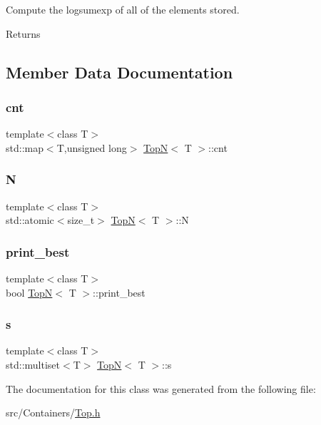 Compute the logsumexp of all of the elements stored. \begin{DoxyReturn}{Returns}

\end{DoxyReturn}


\subsection{Member Data Documentation}
\mbox{\label{class_top_n_a0b10798cc83ac3b20bfe0dd5f1d45e86}} 
\subsubsection{\texorpdfstring{cnt}{cnt}}
{\footnotesize\ttfamily template$<$class T$>$ \\
std\+::map$<$T,unsigned long$>$ \hyperlink{class_top_n}{TopN}$<$ T $>$\+::cnt}

\mbox{\label{class_top_n_a1a4f701ca7296acfadcb6d0511247fcf}} 
\subsubsection{\texorpdfstring{N}{N}}
{\footnotesize\ttfamily template$<$class T$>$ \\
std\+::atomic$<$size\+\_\+t$>$ \hyperlink{class_top_n}{TopN}$<$ T $>$\+::N}

\mbox{\label{class_top_n_a90472852f225e5b851446e4b7ced4856}} 
\subsubsection{\texorpdfstring{print\+\_\+best}{print\_best}}
{\footnotesize\ttfamily template$<$class T$>$ \\
bool \hyperlink{class_top_n}{TopN}$<$ T $>$\+::print\+\_\+best}

\mbox{\label{class_top_n_a1fea03a721d2485b03cc38834775c924}} 
\subsubsection{\texorpdfstring{s}{s}}
{\footnotesize\ttfamily template$<$class T$>$ \\
std\+::multiset$<$T$>$ \hyperlink{class_top_n}{TopN}$<$ T $>$\+::s}



The documentation for this class was generated from the following file\+:\begin{DoxyCompactItemize}
\item 
src/\+Containers/\hyperlink{_top_8h}{Top.\+h}\end{DoxyCompactItemize}
